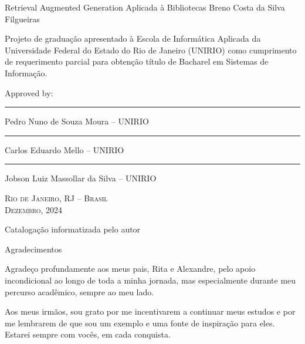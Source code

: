 \documentclass[a4paper, 12pt]{article}
\begin{document}
    \clearpage

    \begin{center}
        Retrieval Augmented Generation Aplicada à Bibliotecas
        \vskip 0.5cm
        Breno Costa da Silva Filgueiras
        \vskip 2.0cm
    \end{center}

    \begin{flushright}
        \parbox{8.0cm}{
        Projeto de graduação apresentado à Escola de Informática Aplicada
        da Universidade Federal do Estado do Rio de Janeiro (UNIRIO) como
        cumprimento de requerimento parcial para obtenção título de Bacharel em
        Sistemas de Informação.}
        \vskip 1.5cm
        Approved by:
        \vskip 1.5cm
        \rule{10.0cm}{.1mm}

        Pedro Nuno de Souza Moura -- UNIRIO
        \vskip 1.0cm
        
        \rule{10.0cm}{.1mm}

        Carlos Eduardo Mello -- UNIRIO
        \vskip 1.0cm

        \rule{10.0cm}{.1mm}

        Jobson Luiz Massollar da Silva -- UNIRIO
        \vskip 1.0cm
    \end{flushright}
    \begin{center}
        \textsc{Rio de Janeiro, RJ -- Brasil} \\ \textsc{Dezembro, 2024}
    \end{center}
    \clearpage

    \vfill
    
    \begin{center}
        Catalogação informatizada pelo autor
    \end{center}

    \clearpage

    \begin{flushright}
        Agradecimentos
    \end{flushright}
    
    Agradeço profundamente aos meus pais, Rita e Alexandre, pelo apoio incondicional ao longo de toda a minha jornada, mas especialmente durante meu percurso acadêmico, sempre ao meu lado.

    Aos meus irmãos, sou grato por me incentivarem a continuar meus estudos e por me lembrarem de que sou um exemplo e uma fonte de inspiração para eles. Estarei sempre com vocês, em cada conquista.
    
\end{document}
